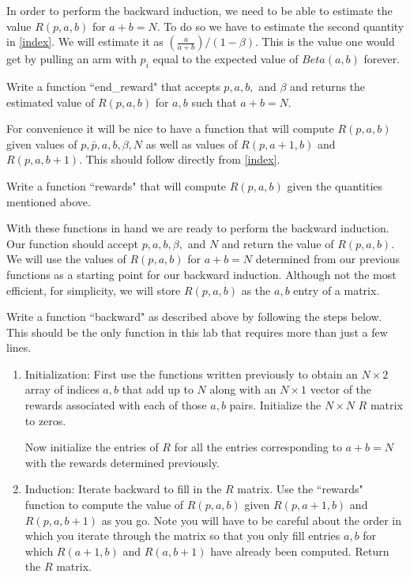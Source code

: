 In order to perform the backward induction, we need to be able to estimate the value $R(p,a,b)$ for $a+b = N$.  To do so we have to estimate the second quantity in \eqref{index}.  We will estimate it as $(\frac{a}{a+b})/(1-\beta)$.  This is the value one would get by pulling an arm with $p_i$ equal to the expected value of $Beta(a,b)$ forever.
\begin{problem}
Write a function ``end\_reward" that accepts $p,a,b,$ and $\beta$ and returns the estimated value of $R(p,a,b)$ for $a,b$ such that $a+b=N$.
\end{problem} 

For convenience it will be nice to have a function that will compute $R(p,a,b)$ given values of $p,\bar{p},a,b,\beta,N$ as well as values of $R(p,a+1,b)$ and $R(p,a,b+1)$.  This should follow directly from \eqref{index}. 

\begin{problem}
Write a function ``rewards" that will compute $R(p,a,b)$ given the quantities mentioned above.
\end{problem}

With these functions in hand we are ready to perform the backward induction.  Our function should accept $p,a,b,\beta,$ and $N$ and return the value of $R(p,a,b)$.  We will use the values of $R(p,a,b)$ for $a+b = N$ determined from our previous functions as a starting point for our backward induction.  Although not the most efficient, for simplicity, we will store $R(p,a,b)$  as the $a,b$ entry of a matrix.

\begin{problem}
Write a function ``backward" as described above by following the steps below.  This should be the only function in this lab that requires more than just a few lines.

\begin{enumerate}
\item   Initialization: First use the functions written previously to obtain an $N\times 2$ array of indices $a,b$ that add up to $N$ along with an $N\times 1$ vector of the rewards associated with each of those $a,b$ pairs.  Initialize the $N\times N$ $R$ matrix to zeros.
    
    Now initialize the entries of $R$ for all the entries corresponding to $a+b = N$ with the rewards determined previously.
    
\item   Induction: Iterate backward to fill in the $R$ matrix.  Use the ``rewards" function to compute the value of $R(p,a,b)$ given $R(p,a+1,b)$ and $R(p,a,b+1)$ as you go.  Note you will have to be careful about the order in which you iterate through the matrix so that you only fill entries $a,b$ for which $R(a+1,b)$ and $R(a,b+1)$ have already been computed.  Return the $R$ matrix.
\end{enumerate}
\end{problem}

